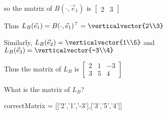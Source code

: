 \documentclass{ximera}
\begin{document}
\begin{question}
\begin{solution}
\begin{hint}
      so the matrix of $B(\cdot,\vec{e}_1)$ is \(\begin{bmatrix} 2 &3\end{bmatrix}\)
    \end{hint}
    \begin{hint}
      Thus $L_B(\vec{e}_1) = B(\cdot, \vec{e}_1)^\top = \verticalvector{2\\3}$
    \end{hint}
    \begin{hint}
      Similarly, $L_B(\vec{e}_2) = \verticalvector{1\\5}$ and $L_B(\vec{e}_3)=\verticalvector{-3\\4}$
    \end{hint}
    \begin{hint}
      Thus the matrix of $L_B$ is \(\begin{bmatrix} 2&1&-3\\3&5&4\end{bmatrix}\)
    \end{hint}

    What is the matrix of $L_B$?
    \begin{matrix-answer}
      correctMatrix = [['2','1','-3'],['3','5','4']]
    \end{matrix-answer}
  \end{solution}
\end{question}
\end{document}
